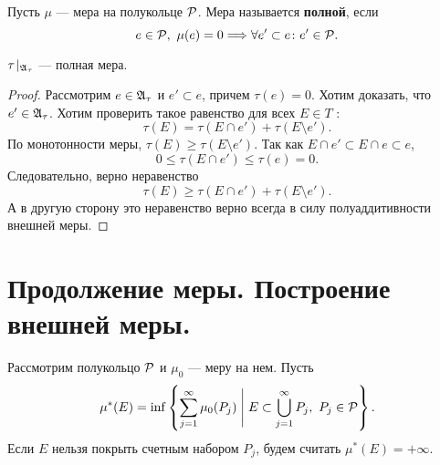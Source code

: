 \begin{defn}
    Пусть $ \mu $ --- мера на полукольце $ \P$. Мера называется {\bf полной}, если
	\[
		e \in \P, ~ \mu(e) = 0 \Longrightarrow \forall e' \subset e \colon e' \in \P
	.\] 
\end{defn}
\begin{cor}
    $ \tau\!\mid_{\A_{\tau }} $ --- полная мера.
\end{cor}
\begin{proof}
	Рассмотрим $ e \in \A_{\tau }$ и $ e' \subset e$, причем $ \tau (e) = 0$. Хотим доказать, что $ e' \in \A_{\tau }$.
	Хотим проверить такое равенство для всех $ E \in T$ :
	\[
		\tau (E) = \tau (E\cap e') + \tau (E \setminus e')
	.\] 
	По монотонности меры, $ \tau (E) \ge \tau (E \setminus e')$.
	Так как $ E \cap e' \subset E \cap e \subset e$,
	\[
		0 \le \tau (E \cap e') \le \tau (e) = 0
	.\] 
	Следовательно, верно неравенство 
	\[
		\tau (E) \ge  \tau (E \cap e') + \tau (E \setminus e')
	.\] 
	А в другую сторону это неравенство верно всегда в силу полуаддитивности внешней меры.
\end{proof}

\section{Продолжение меры. Построение внешней меры.}
\begin{name}
    Рассмотрим полукольцо $ \P$ и $ \mu _0$ --- меру на нем. Пусть 
	\[
		\mu ^{*}(E) = \inf \left\{ \sum_{j=1}^{\infty} \mu _0(P_j) \Biggm| E \subset \bigcup_{j=1}^{\infty} P_j, ~ P_j \in \P \right\}
	.\] 
	Если $ E$ нельзя покрыть счетным набором $ P_j$, будем считать $ \mu ^{*} (E)= +\infty$.
\end{name}

